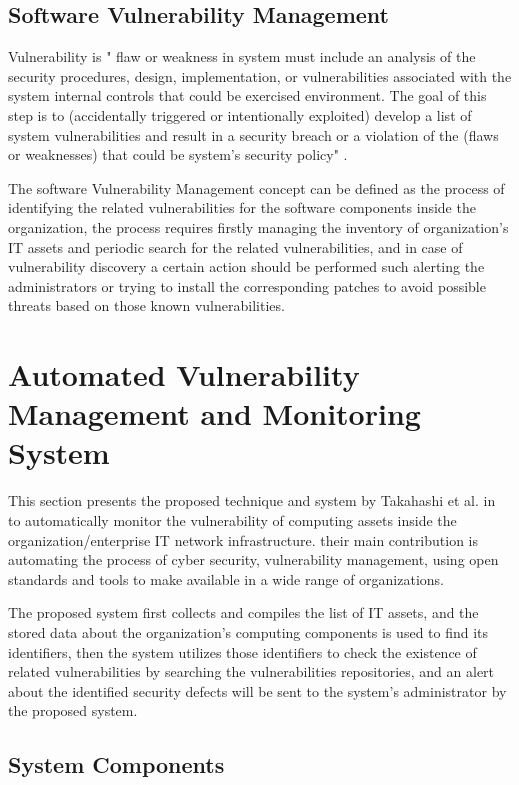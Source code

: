 \documentclass{llncs}
\begin{document}
\subsection{Software Vulnerability Management}

\par Vulnerability is " flaw or weakness in system must include an analysis of the security procedures, design, implementation, or vulnerabilities associated with the system internal controls that could be exercised environment. The goal of this step is to (accidentally triggered or intentionally exploited) develop a list of system vulnerabilities and result in a security breach or a violation of the (flaws or weaknesses) that could be system’s security policy" \cite{vuln}.  
\par The software Vulnerability Management concept can be defined as the process of identifying the related vulnerabilities for the software components inside the organization, the process requires firstly managing the inventory of organization's IT assets and periodic search for the related vulnerabilities, and in case of vulnerability discovery a certain action should be performed such alerting the administrators or trying to install the corresponding patches to avoid possible threats based on those known vulnerabilities.    
\newpage
\section{Automated Vulnerability Management and Monitoring System}

\par This section presents the proposed technique and system by Takahashi et al. in \cite{paper1} to automatically monitor the vulnerability of computing assets inside the organization/enterprise IT network infrastructure. their main contribution is automating the process of cyber security, vulnerability management, using open standards and tools to make available in a wide range of organizations.
\par
 The proposed system first collects and compiles the list of IT assets, and the stored data about the organization's computing components is used to find its identifiers, then the system utilizes those identifiers to check the existence of related vulnerabilities by searching the vulnerabilities repositories, and an alert about the identified security defects will be sent to the system's administrator by the proposed system.
    
\subsection{System Components}
\end{document}
